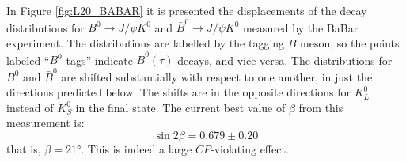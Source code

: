 \documentclass[../../main/main.tex]{subfiles}
\begin{document}

In Figure \ref{fig:L20_BABAR} it is presented the displacements of the decay distributions for \( B^0 \rightarrow J/\psi K^0 \) and \( \bar{B}^0 \rightarrow J/\psi K^0 \) measured by the BaBar experiment. The distributions are labelled by the tagging \( B \) meson, so the points labeled ``\( B^0 \) tags'' indicate \( \bar{B}^0(\tau) \) decays, and vice versa. The distributions for \( B^0 \) and \( \bar{B}^0 \) are shifted substantially with respect to one another, in just the directions predicted below. The shifts are in the opposite directions for \( K^0_L \) instead of \( K^0_S \) in the final state. The current best value of \( \beta \) from this measurement is:
\begin{equation}
	\sin 2\beta
	=
	0.679 \pm 0.20
	\label{eq:}
\end{equation}
that is, \( \beta = 21\text{°} \). This is indeed a large \( CP \)-violating effect.
\end{document}
